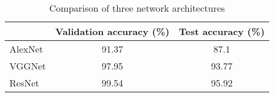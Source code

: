 \documentclass[11pt,twoside,a4paper]{article}
\begin{document}
\begin{table}[!h]
  \begin{adjustwidth}{-.5in}{-.5in}
  \begin{center}
    \begin{tabular}{l | c | c}
       & Validation accuracy (\%) & Test accuracy (\%) \\
      \hline
	AlexNet & 91.37 & 87.1\\
	VGGNet & 97.95 & 93.77\\
	ResNet & 99.54 & 95.92\\
    \end{tabular}
    \caption{Comparison of three network architectures}
    \label{tab:vggres}
  \end{center}
  \end{adjustwidth}
\end{table}
\end{document}
